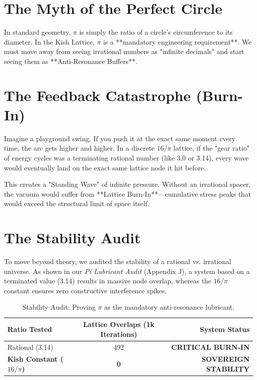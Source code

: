 \documentclass[11pt, letterpaper, openany]{book}
\begin{document}
\section{The Myth of the Perfect Circle}
In standard geometry, $\pi$ is simply the ratio of a circle's circumference to its diameter. In the Kish Lattice, $\pi$ is a **mandatory engineering requirement**. We must move away from seeing irrational numbers as "infinite decimals" and start seeing them as **Anti-Resonance Buffers**.

\section{The Feedback Catastrophe (Burn-In)}
Imagine a playground swing. If you push it at the exact same moment every time, the arc gets higher and higher. In a discrete $16/\pi$ lattice, if the "gear ratio" of energy cycles was a terminating rational number (like 3.0 or 3.14), every wave would eventually land on the exact same lattice node it hit before. 



This creates a "Standing Wave" of infinite pressure. Without an irrational spacer, the vacuum would suffer from **Lattice Burn-In**—cumulative stress peaks that would exceed the structural limit of space itself. 

\section{The Stability Audit}
To move beyond theory, we audited the stability of a rational vs. irrational universe. As shown in our \textit{Pi Lubricant Audit} (Appendix J), a system based on a terminated value (3.14) results in massive node overlap, whereas the $16/\pi$ constant ensures zero constructive interference spikes. 

\begin{table}[H]
    \centering
    \renewcommand{\arraystretch}{1.5}
    \begin{tabular}{|l|c|r|}
        \hline
        \textbf{Ratio Tested} & \textbf{Lattice Overlaps (1k Iterations)} & \textbf{System Status} \\ \hline
        Rational (3.14) & 492 & \textbf{CRITICAL BURN-IN} \\ \hline
        \textbf{Kish Constant ($16/\pi$)} & \textbf{0} & \textbf{SOVEREIGN STABILITY} \\ \hline
    \end{tabular}
    \caption{Stability Audit: Proving $\pi$ as the mandatory anti-resonance lubricant.}
\end{table}
\end{document}

